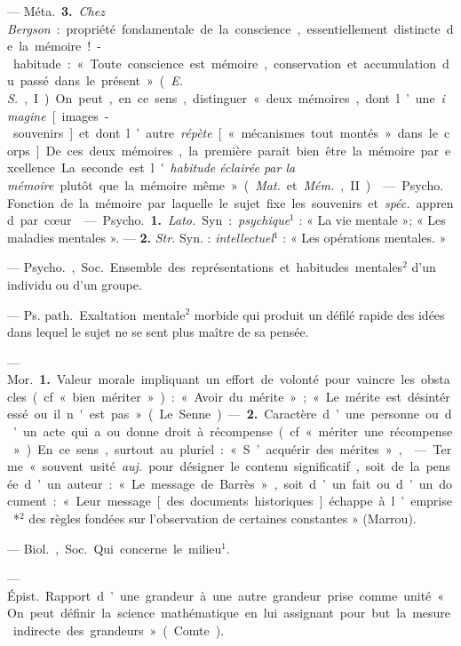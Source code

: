 \begin{itemize}[leftmargin=1cm, label=, itemsep=1pt]
— \si{Méta.} {\bf 3.} {\it Chez Bergson} : propriété fondamentale de la
conscience, essentiellement distincte de la mémoire!-habitude : « Toute
conscience est mémoire, conservation et accumulation du passé dans le
présent » ({\it E. S.}, I). On peut, en ce sens, distinguer « deux mémoires,
dont l’une {\it imagine} [images-souvenirs] et dont l’autre {\it répète}
[« mécanismes tout montés » dans le corps]... De ces deux mémoires, la
première paraît bien être la mémoire par excellence. La seconde. est
l'{\it habitude éclairée par la mémoire} plutôt que la mémoire même »
({\it Mat.} et {\it Mém.}, II).

 — \si{Psycho.} Fonction de la mémoire par
laquelle le sujet fixe les souvenirs et {\it spéc.} apprend par cœur.

 — \si{Psycho.} {\bf 1.} {\it Lato.} Syn. : {\it psychique}$^1$ :
« La vie mentale »; « Les maladies mentales ». — {\bf 2.} {\it Str.} Syn. :
{\it intellectuel}$^1$ : « Les opérations mentales. »

 — \si{Psycho.}, \si{Soc.} Ensemble des représentations et
habitudes mentales$^2$ d’un individu ou d’un groupe.

 — \si{Ps. path.} Exaltation mentale$^2$ morbide qui produit un
défilé rapide des idées dans lequel le sujet ne se sent plus maître de sa
pensée.

 — \si{Mor.} {\bf 1.} Valeur morale impliquant un effort de
volonté pour vaincre les obstacles (cf. « bien mériter ») : « Avoir du
mérite » ; « Le mérite est désintéressé ou il n'est pas » (Le Senne). —
{\bf 2.} Caractère d’une personne ou d’un acte qui a ou donne droit à
récompense (cf. « mériter une récompense »). En ce sens, surtout au pluriel :
« S’acquérir des mérites »,

 — Terme «souvent usité {\it auj.} pour désigner le contenu
significatif, soit de la pensée d’un auteur : « Le message de Barrès », soit
d’un fait ou d’un document : « Leur message [des documents historiques]
échappe à l’emprise*$^2$ des règles fondées sur l'observation de certaines
constantes » (Marrou).

 — \si{Biol.}, \si{Soc.} Qui concerne le milieu$^1$.

 — \si{Épist.} Rapport d’une grandeur à une autre grandeur prise
comme unité « On peut définir la science mathématique en lui assignant pour
but la mesure indirecte des grandeurs » (Comte).


\end{itemize}
